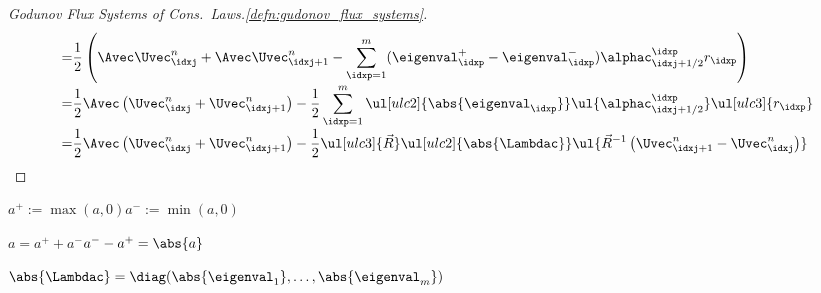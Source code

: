 \begin{proofbox}
\begin{proof}[Godunov Flux Systems of Cons.\ Laws.\cref{defn:gudonov_flux_systems}]
\begin{align*}
          =&\frac{1}{2}\left(\Avec\Uvec_{\idxj}^{n}+\Avec\Uvec_{\idxj+1}^{n}-\sum_{\idxp=1}^{m}(\eigenval_{\idxp}^{+}-\eigenval_{\idxp}^{-})
          \alphac_{\idxj+1/2}^{\idxp}r_{\idxp}\right)\\[-1\jot]
          =&\frac{1}{2}\Avec\left(\Uvec_{\idxj}^{n}+\Uvec_{\idxj+1}^{n}\right)-\frac{1}{2}\sum_{\idxp=1}^{m}\ul[ulc2]{\abs{\eigenval_{\idxp}}}\ul{\alphac_{\idxj+1/2}^{\idxp}}
             \ul[ulc3]{r_{\idxp}}\\[-1\jot]
          =&\frac{1}{2}\Avec\left(\Uvec_{\idxj}^{n}+\Uvec_{\idxj+1}^{n}\right)-\frac{1}{2}\ul[ulc3]{\vec{R}}\ul[ulc2]{\abs{\Lambdac}}\ul{\vec{R}^{-1}\left(\Uvec_{\idxj+1}^{n}-\Uvec_{\idxj}^{n}\right)}
        \end{align*}
    \end{proof}
\end{proofbox}
\begin{notebox}[Notes]\nospacing
    \begin{itemizenosep}
        \item $a^{+}:=\max(a,0)$\hfil$a^{-}:=\min(a,0)$
        \item $a=a^{+}+a^{-}$\hfil$a^{-}-a^{+}=\abs{a}$
        \item $\abs{\Lambdac}=\diag(\abs{\eigenval_{1}},\ldots,\abs{\eigenval_{m}})$
    \end{itemizenosep}
\end{notebox}
